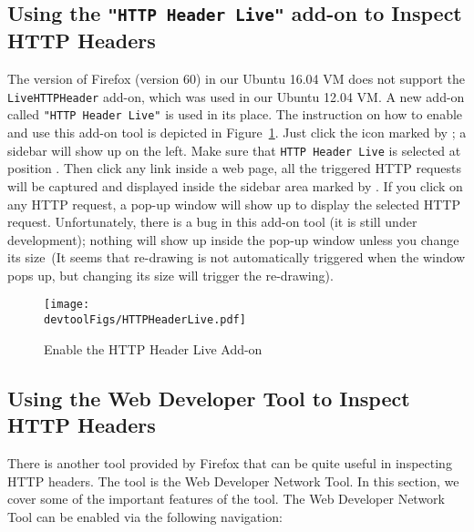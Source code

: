 
\newcommand{\devtoolFigs}{../Web_Common/Figs}


\subsection{Using the \texttt{"HTTP Header Live"} add-on to Inspect HTTP Headers}
\label{web:sec:httpheaderlive}


The version of Firefox (version 60) in our Ubuntu 16.04 VM does not support the
\texttt{LiveHTTPHeader} add-on, which was used in our Ubuntu 12.04 VM. 
A new add-on called \texttt{"HTTP Header Live"} is used in its place. 
The instruction on how to enable and use this add-on tool
is depicted in Figure~\ref{web:fig:httpheader}. Just click the icon marked
by ; a sidebar will show up on the left. Make sure that
\texttt{HTTP Header Live} is selected at position . Then click
any link inside a web page, all the triggered HTTP requests will be
captured and displayed inside the sidebar area marked by .
If you click on any HTTP request, a pop-up window will show up to display
the selected HTTP request. Unfortunately, there is a bug in this add-on
tool (it is still under development); nothing will show up inside the
pop-up window unless you change its size~(It seems that re-drawing
is not automatically triggered when the window pops up, but changing its
size will trigger the re-drawing).


\begin{figure}[htb]
\begin{center}
\texttt{[image: \\devtoolFigs/HTTPHeaderLive.pdf]}
\end{center}
\caption{Enable the HTTP Header Live Add-on}
\label{web:fig:httpheader}
\end{figure}




\subsection{Using the Web Developer Tool to Inspect HTTP Headers}
\label{web:sec:web_dev_tools}


There is
another tool provided by Firefox that can be quite useful 
in inspecting HTTP headers. 
The tool is the Web Developer Network Tool.  In this
section, we cover some of the important features of the tool. 
The Web Developer Network Tool can be enabled via the following navigation: 



